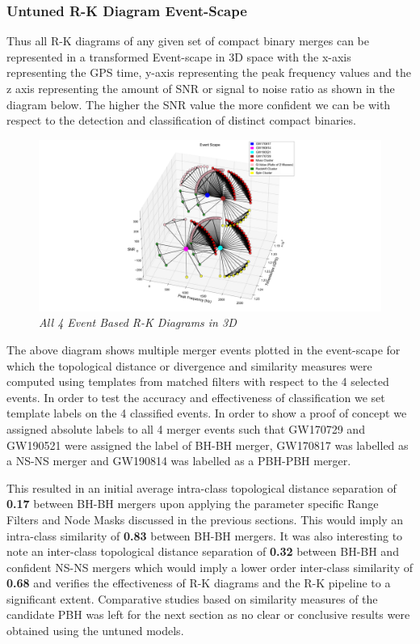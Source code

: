 \subsubsection{Untuned R-K Diagram Event-Scape}

Thus all R-K diagrams of any given set of compact binary merges can be represented in a transformed Event-scape in 3D space with the x-axis representing the GPS time, y-axis representing the peak frequency values and the z axis representing the amount of SNR or signal to noise ratio as shown in the diagram below. The higher the SNR value the more confident we can be with respect to the detection and classification of distinct compact binaries.

    \begin{figure}[H]
        \centering
        \includegraphics[width=1.0\linewidth]{images/74_33_All 4 Diagrmas in 3D_2.png}
        \caption{\textit{All 4 Event Based R-K Diagrams in 3D}}
        \label{fig:LIGO15_PlaceHolder_fig}
    \end{figure}

The above diagram shows multiple merger events plotted in the event-scape for which the topological distance or divergence and similarity measures were computed using templates from matched filters with respect to the 4 selected events. In order to test the accuracy and effectiveness of classification we set template labels on the 4 classified events. In order to show a proof of concept we assigned absolute labels to all 4 merger events such that GW170729 and GW190521 were assigned the label of BH-BH merger, GW170817 was labelled as a NS-NS merger and GW190814 was labelled as a PBH-PBH merger.

This resulted in an initial average intra-class topological distance separation of \textbf{0.17} between BH-BH mergers upon applying the parameter specific Range Filters and Node Masks discussed in the previous sections. This would imply an intra-class similarity of \textbf{0.83} between BH-BH mergers. It was also interesting to note an inter-class topological distance separation of \textbf{0.32} between BH-BH and confident NS-NS mergers which would imply a lower order inter-class similarity of \textbf{0.68} and verifies the effectiveness of R-K diagrams and the R-K pipeline to a significant extent. Comparative studies based on similarity measures of the candidate PBH was left for the next section as no clear or conclusive results were obtained using the untuned  models. 


